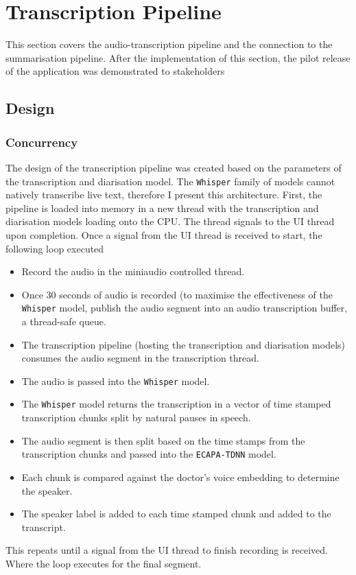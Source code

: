 \section{Transcription Pipeline}
This section covers the audio-transcription pipeline and the connection to the summarisation pipeline. After the implementation of this section, the pilot release of the application was demonstrated to stakeholders
\subsection{Design}
\subsubsection{Concurrency}
The design of the transcription pipeline was created based on the parameters of the transcription and diarisation model. The \texttt{Whisper} family of models cannot natively transcribe live text, therefore I present this architecture.  First, the pipeline is loaded into memory in a new thread with the transcription and diarisation models loading onto the CPU. The thread signals to the UI thread upon completion. Once a signal from the UI thread is received to start, the following loop executed
\begin{itemize}
    \item Record the audio in the miniaudio controlled thread.
    \item Once 30 seconds of audio is recorded (to maximise the effectiveness of the \texttt{Whisper} model\cite{radford2022whisper}, publish the audio segment into an audio transcription buffer, a thread-safe queue. 
    \item The transcription pipeline (hosting the transcription and diarisation models) consumes the audio segment in the transcription thread.
    \item The audio is passed into the \texttt{Whisper} model.
    \item The \texttt{Whisper} model returns the transcription in a vector of time stamped transcription chunks split by natural pauses in speech.
    \item The audio segment is then split based on the time stamps from the transcription chunks and passed into the \texttt{ECAPA-TDNN} model.
    \item Each chunk is compared against the doctor's voice embedding to determine the speaker.
    \item The speaker label is added to each time stamped chunk and added to the transcript.
\end{itemize}
This repeats until a signal from the UI thread to finish recording is received. Where the loop executes for the final segment.

